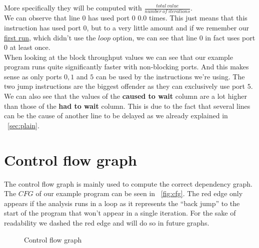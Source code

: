 \documentclass[a4paper,12pt,titlepage, twoside]{report}
\begin{document}
More specifically they will be computed with $\frac{total\ value}{number\ of\ iterations}$.\\
We can observe that line $0$ has used port $0$ $0.0$ times. This just means that this instruction has used port $0$, but to a very little amount and if we remember our \hyperref[sec:plain]{first run}, which didn't use the $loop$ option, we can see that line $0$ in fact uses port $0$ at least once.\\
When looking at the block throughput values we can see that our example program runs quite significantly faster with non-blocking ports. And this makes sense as only ports $0, 1$ and $5$ can be used by the instructions we're using. The two jump instructions are the biggest offender as they can exclusively use port $5$.\\
We can also see that the values of the \textbf{caused to wait} column are a lot higher than those of the \textbf{had to wait} column. This is due to the fact that several lines can be the cause of another line to be delayed as we already explained in ~\autoref{sec:plain}.

\section{Control flow graph}
The control flow graph is mainly used to compute the correct dependency graph. The $CFG$ of our example program can be seen in ~\autoref{fig:cfg}. The red edge only appears if the analysis runs in a loop as it represents the ``back jump'' to the start of the program that won't appear in a single iteration. For the sake of readability we dashed the red edge and will do so in future graphs.

\begin{figure}
    \centering
    \caption{Control flow graph}
    \label{fig:cfg}
\end{figure}
\end{document}
